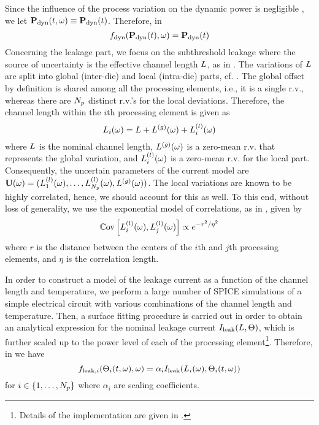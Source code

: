 Since the influence of the process variation on the dynamic power is negligible \cite{juan2012, srivastava2010}, we let $\mathbf{P}_{\text{dyn}}(t, \omega) \equiv \mathbf{P}_{\text{dyn}}(t)$. Therefore, in 
\[
  f_{\text{dyn}}(\mathbf{P}_{\text{dyn}}(t), \omega) = \mathbf{P}_{\text{dyn}}(t)
\]
Concerning the leakage part, we focus on the subthreshold leakage where the source of uncertainty is the effective channel length $L$, as in \cite{juan2012}. The variations of $L$ are split into global (inter-die) and local (intra-die) parts, cf. \cite{juan2012, srivastava2010, shen2009}. The global offset by definition is shared among all the processing elements, i.e., it is a single r.v., whereas there are ${N_p}$ distinct r.v.'s for the local deviations. Therefore, the channel length within the $i$th processing element is given as
\[
  L_i(\omega) = L + {L^{(g)}}(\omega) + L^{(l)}_i(\omega)
\]
where $L$ is the nominal channel length, ${L^{(g)}}(\omega)$ is a zero-mean r.v. that represents the global variation, and $L^{(l)}_i(\omega)$ is a zero-mean r.v. for the local part. Consequently, the uncertain parameters of the current model are $\mathbf{U}(\omega) = (L^{(l)}_1(\omega), \dotsc, L^{(l)}_{N_p}(\omega), {L^{(g)}}(\omega) )$. The local variations are known to be highly correlated, hence, we should account for this as well. To this end, without loss of generality, we use the exponential model of correlations, as in \cite{shen2009}, given by
\begin{equation} \elabel{covariance}
  \oCov{\lLeff_i(\o), \lLeff_j(\o)} \propto e^{-r^2/\eta^2}
\end{equation}
where $r$ is the distance between the centers of the $i$th and $j$th processing elements, and $\eta$ is the correlation length.

In order to construct a model of the leakage current as a function of the channel length and temperature, we perform a large number of SPICE simulations of a simple electrical circuit with various combinations of the channel length and temperature. Then, a surface fitting procedure is carried out in order to obtain an analytical expression for the nominal leakage current $I_{\text{leak}}(L, \Theta)$, which is further scaled up to the power level of each of the processing element\footnote{Details of the implementation are given in .}. Therefore, in  we have
\[
  f_{\text{leak}, i}(\Theta_i(t, \omega), \omega) = \alpha_i I_{\text{leak}}(L_i(\omega), \Theta_i(t, \omega))
\]
for $i \in \{ 1, \dotsc, {N_p} \}$ where $\alpha_i$ are scaling coefficients.
